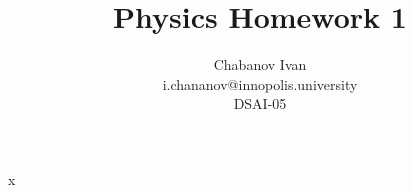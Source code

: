 
\begin{titlepage}

    x
    
    \vspace{20mm}
    \title{Physics Homework 1}
    \author{Chabanov Ivan\\i.chananov@innopolis.university\\DSAI-05}
    \maketitle

\end{titlepage}